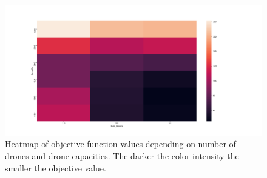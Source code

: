 \begin{figure}[h!]
\includegraphics[width=\linewidth]{heatmap.png}
\caption{Heatmap of objective function values depending on number of drones and drone capacities. The darker the color intensity the smaller the objective value. \label{fig:heatmap}}
\end{figure}
\noindent



